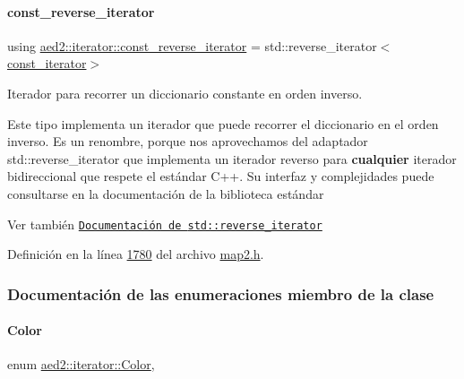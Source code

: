 \paragraph{\texorpdfstring{const\+\_\+reverse\+\_\+iterator}{const\_reverse\_iterator}}
{\footnotesize\ttfamily using \hyperlink{classaed2_1_1iterator_a657402896e5b5966660032f5686cc4c4_a657402896e5b5966660032f5686cc4c4}{aed2\+::iterator\+::const\+\_\+reverse\+\_\+iterator} =  std\+::reverse\+\_\+iterator$<$\hyperlink{classaed2_1_1iterator_1_1const__iterator}{const\+\_\+iterator}$>$}



Iterador para recorrer un diccionario constante en orden inverso. 

Este tipo implementa un iterador que puede recorrer el diccionario en el orden inverso. Es un renombre, porque nos aprovechamos del adaptador {\ttfamily std\+::reverse\+\_\+iterator} que implementa un iterador reverso para {\bfseries cualquier} iterador bidireccional que respete el estándar C++. Su interfaz y complejidades puede consultarse en la documentación de la biblioteca estándar

\begin{DoxySeeAlso}{Ver también}
\href{http://en.cppreference.com/w/cpp/iterator/reverse_iterator}{\tt Documentación de {\ttfamily std\+::reverse\+\_\+iterator}} 
\end{DoxySeeAlso}


Definición en la línea \hyperlink{map2_8h_source_l01780}{1780} del archivo \hyperlink{map2_8h_source}{map2.\+h}.



\subsubsection{Documentación de las enumeraciones miembro de la clase}
\mbox{\label{classaed2_1_1iterator_aaa188f82ba585d8de525b1400242cf4f_aaa188f82ba585d8de525b1400242cf4f}} 
\paragraph{\texorpdfstring{Color}{Color}}
{\footnotesize\ttfamily enum \hyperlink{classaed2_1_1iterator_aaa188f82ba585d8de525b1400242cf4f_aaa188f82ba585d8de525b1400242cf4f}{aed2\+::iterator\+::\+Color}\hspace{0.3cm}{\ttfamily [strong]}, {\ttfamily [private]}}



